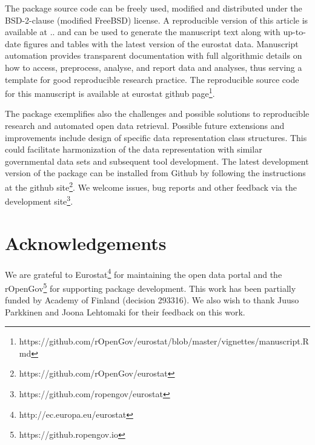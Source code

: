 The package source code can be freely used, modified and distributed
under the BSD-2-clause (modified FreeBSD) license. A reproducible
version of this article is available at .. and can be used to generate
the manuscript text along with up-to-date figures and tables with the
latest version of the eurostat data. Manuscript automation provides
transparent documentation with full algorithmic details on how to
access, preprocess, analyse, and report data and analyses, thus
serving a template for good reproducible research practice. The reproducible source code for this manuscript is available at eurostat github page\footnote{https://github.com/rOpenGov/eurostat/blob/master/vignettes/manuscript.Rmd}.

The package exemplifies also the challenges and possible solutions to
reproducible research and automated open data retrieval. Possible
future extensions and improvements include design of specific data
representation class structures. This could facilitate harmonization
of the data representation with similar governmental data sets and
subsequent tool development. The latest development version of the
package can be installed from Github by following the instructions at
the github site\footnote{https://github.com/rOpenGov/eurostat}. We welcome
issues, bug reports and other feedback via the development
site\footnote{https://github.com/ropengov/eurostat}.


\section*{Acknowledgements}

We are grateful to Eurostat\footnote{http://ec.europa.eu/eurostat} for
maintaining the open data portal and the
rOpenGov\footnote{https://github.ropengov.io} for supporting 
package development. This work has been partially funded by Academy of
Finland (decision 293316). We also wish to thank Juuso Parkkinen and Joona Lehtomaki for their feedback on this work.




\address{Leo Lahti\\
  Department of Mathematics and Statistics\\
  PO Box 20014 University of Turku\\
  Finland\\}

\address{Janne Huovari\\
  Affiliation\\
  Address\\
  Country\\}

\address{Markus Kainu\\
  Affiliation\\
  Address\\
  Country\\}

\address{Przemyslaw Biecek\\
  Faculty of Mathematics, Informatics, and Mechanics\\
  University of Warsaw\\
  Banacha 2, 02-097 Warsaw\\
  Poland\\}

